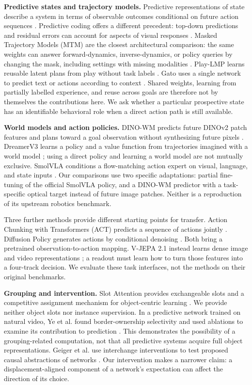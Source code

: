 \documentclass[11pt]{article}
\begin{document}
\textbf{Predictive states and trajectory models.} Predictive representations of state describe a system in terms of observable outcomes conditional on future action sequences \cite{r1}. Predictive coding offers a different precedent: top-down predictions and residual errors can account for aspects of visual responses \cite{r2}. Masked Trajectory Models (MTM) are the closest architectural comparison: the same weights can answer forward-dynamics, inverse-dynamics, or policy queries by changing the mask, including settings with missing modalities \cite{r3}. Play-LMP learns reusable latent plans from play without task labels \cite{r4}. Gato uses a single network to predict text or actions according to context \cite{r5}. Shared weights, learning from partially labelled experience, and reuse across goals are therefore not by themselves the contributions here. We ask whether a particular prospective state has an identifiable behavioral role when a direct action path is still available.

\textbf{World models and action policies.} DINO-WM predicts future DINOv2 patch features and plans toward a goal observation without synthesizing future pixels \cite{r6,r7}. DreamerV3 learns a policy and a value function from trajectories imagined with a world model \cite{r8}; using a direct policy and learning a world model are not mutually exclusive. SmolVLA conditions a flow-matching action expert on visual, language, and state inputs \cite{r9}. Our comparisons use two specific adaptations: partial fine-tuning of the official SmolVLA policy, and a DINO-WM predictor with a task-specific optical target instead of future image patches. Neither is a reproduction of its upstream robotics benchmark.

Three further methods provide different starting points for transfer. Action Chunking with Transformers (ACT) predicts a sequence of actions jointly \cite{r10}. Diffusion Policy generates actions by conditional denoising \cite{r11}. Both bring a pretrained observation-to-action mapping. V-JEPA 2.1 instead learns dense image and video representations \cite{r12}; a readout must learn how to turn those features into a four-track decision. We evaluate these task interfaces, not the methods on their original benchmarks.

\textbf{Grouping and intervention.} Slot Attention provides exchangeable slots and a competitive assignment mechanism for object-centric learning \cite{r13}. We provide neither object slots nor instance supervision. In a predictive network trained on natural video, Ye et al. found border-ownership selectivity and used ablations to examine its contribution to prediction \cite{r14}. This demonstrates the possibility of a grouping-related computation, not that all predictive systems acquire full object representations. Geiger et al. use interchange interventions to test proposed causal abstractions of networks \cite{r15}. Our intervention makes a narrower claim: a displacement-aligned component of a network's expectation can affect the direction of its choice.
\end{document}
